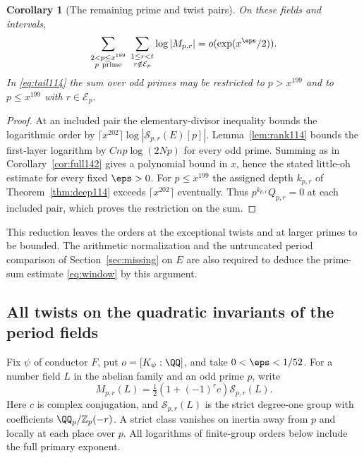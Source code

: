 \documentclass[a4paper,11pt]{article}
\newtheorem{corollary}[proposition]{Corollary}
\theoremstyle{definition}
\theoremstyle{remark}
\newcommand{\ZZ}{\mathbb Z}\newcommand{\ord}{\operatorname{ord}}
\numberwithin{equation}{section}
\begin{document}
\begin{corollary}[The remaining prime and twist pairs]\label{cor:sum144}
On these fields and intervals,
\[
 \sum_{\substack{2<p\le x^{199}\\p\ {\rm prime}}}
 \ \sum_{\substack{1\le r<t\\r\notin\mathcal E_p}}
                      \log|M_{p,r}|=o(\exp(x^\eps/2)).
\]
In \eqref{eq:tail114} the sum over odd primes may be restricted
to \(p>x^{199}\) and to \(p\le x^{199}\) with \(r\in\mathcal E_p\).
\end{corollary}
\begin{proof}
At an included pair the elementary-divisor inequality bounds
the logarithmic order by
\(\lceil x^{202}\rceil\log|\mathcal S_{p,r}(E)[p]|\).
Lemma~\ref{lem:rank114} bounds the first-layer logarithm by
\(Cnp\log(2Np)\) for every odd prime. Summing as in
Corollary~\ref{cor:full142} gives a polynomial bound in \(x\),
hence the stated little-oh estimate for every fixed \(\eps>0\).
For \(p\le x^{199}\) the assigned depth \(k_{p,r}\) of
Theorem~\ref{thm:deep114} exceeds \(\lceil x^{202}\rceil\)
eventually. Thus \(p^{k_{p,r}}Q_{p,r}=0\) at each included
pair, which proves the restriction on the sum.
\end{proof}

This reduction leaves the orders at the exceptional twists and
at larger primes to be bounded. The arithmetic normalization
and the untruncated period comparison of Section~\ref{sec:missing}
on \(E\) are also required to deduce the prime-sum estimate
\eqref{eq:window} by this argument.

\subsection{All twists on the quadratic invariants of the period fields}\label{nav:II-34}
Fix \(\psi\) of conductor \(F\), put \(o=[K_\psi:\QQ]\), and
take \(0<\eps<1/52\). For a number field \(L\) in the abelian
family and an odd prime \(p\), write
\[
 M_{p,r}(L)=\tfrac12(1+(-1)^r c)\mathcal S_{p,r}(L).
\]
Here \(c\) is complex conjugation, and \(\mathcal S_{p,r}(L)\)
is the strict degree-one group with coefficients
\(\QQ_p/\ZZ_p(-r)\). A strict class vanishes on inertia away
from \(p\) and locally at each place over \(p\). All logarithms
of finite-group orders below include the full primary exponent.
\end{document}

